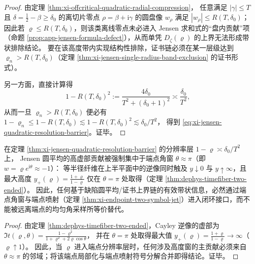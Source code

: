 \begin{proof}
由定理 \ref{thm:xi-offcritical-quadratic-radial-compression}，
任意满足 \(|\gamma|\le T\) 且 \(\delta=\tfrac12-\beta\ge\delta_0\) 的离切片零点 \(\rho=\beta+\mathrm{i}\gamma\) 的圆盘像 \(w_\rho\) 满足
\(|w_\rho|\le R(T,\delta_0)\)；
因此若 \(\varrho\le R(T,\delta_0)\)，则该类离线零点未必进入 Jensen 求和式的“盘内贡献”项（命题 \ref{prop:app-jensen-formula-defect}），从而单凭 \(D_\zeta(\varrho)\) 的上界无法形成带状排除结论。
要在该高度带内实现结构性排除，证书链必须在某一层级达到 \(\varrho_n>R(T,\delta_0)\)（定理 \ref{thm:xi-jensen-single-radius-band-exclusion} 的证书形式）。
\par
另一方面，直接计算得
\[
1-R(T,\delta_0)^2
:=\frac{4\delta_0}{T^2+(\delta_0+1)^2}
\asymp \frac{\delta_0}{T^2},
\]
从而一旦 \(\varrho_n>R(T,\delta_0)\) 便必有
\(
1-\varrho_n\le 1-R(T,\delta_0)\lesssim 1-R(T,\delta_0)^2\lesssim \delta_0/T^2
\)，
得到 \eqref{eq:xi-jensen-quadratic-resolution-barrier}。证毕。
\end{proof}

\begin{corollary}\label{cor:xi-jensen-endpoint-angle-window-rigidity}
在定理 \ref{thm:xi-jensen-quadratic-resolution-barrier} 的分辨率层 \(1-\varrho\asymp \delta_0/T^2\) 上，
Jensen 圆平均的高虚部贡献被强制集中于端点角窗 \(\theta\approx \pi\)（即 \(w=\varrho e^{\mathrm{i}\theta}\approx -1\)）：
等半径纤维在上半平面中的逆像同时触及 \(y\downarrow 0\) 与 \(y\uparrow \infty\)，且最大高度 \(y_+(\varrho)=\frac{1+\varrho}{1-\varrho}\) 仅在 \(\theta=\pi\) 处取得（定理 \ref{thm:dephys-timefiber-two-ended}）。
因此，任何基于缺陷圆平均/证书上界链的有效带状信息，必然通过端点角窗与端点喷射（定理 \ref{thm:xi-endpoint-two-symbol-jet}）进入闭环接口，而不能被远离端点的均匀角采样所等价替代。
\end{corollary}

\begin{proof}
由定理 \ref{thm:dephys-timefiber-two-ended}，Cayley 逆像的虚部为
\(
\Im t(\varrho,\theta)=\frac{1-\varrho^2}{1+\varrho^2+2\varrho\cos\theta}
\)，
并在 \(\theta=\pi\) 处取得最大值 \(y_+(\varrho)=\frac{1+\varrho}{1-\varrho}\to\infty\)（\(\varrho\uparrow 1\)）。
因此，当 \(\varrho\) 进入端点分辨率层时，任何涉及高度窗的主贡献必须来自 \(\theta\approx\pi\) 的邻域；将该端点局部化与端点喷射符号分解合并即得结论。证毕。
\end{proof}

